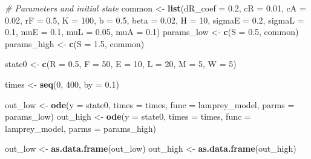\documentclass[
]{article}
\newenvironment{Shaded}{\begin{snugshade}}{\end{snugshade}}
\newcommand{\AttributeTok}[1]{\textcolor[rgb]{0.13,0.29,0.53}{#1}}
\newcommand{\CommentTok}[1]{\textcolor[rgb]{0.56,0.35,0.01}{\textit{#1}}}
\newcommand{\DecValTok}[1]{\textcolor[rgb]{0.00,0.00,0.81}{#1}}
\newcommand{\FloatTok}[1]{\textcolor[rgb]{0.00,0.00,0.81}{#1}}
\newcommand{\FunctionTok}[1]{\textcolor[rgb]{0.13,0.29,0.53}{\textbf{#1}}}
\newcommand{\NormalTok}[1]{#1}
\newcommand{\OtherTok}[1]{\textcolor[rgb]{0.56,0.35,0.01}{#1}}
\begin{document}
\begin{Shaded}
\begin{Highlighting}[]
\CommentTok{\# Parameters and initial state}
\NormalTok{common }\OtherTok{\textless{}{-}} \FunctionTok{list}\NormalTok{(}\AttributeTok{dR\_coef =} \FloatTok{0.2}\NormalTok{, }\AttributeTok{cR =} \FloatTok{0.01}\NormalTok{, }\AttributeTok{cA =} \FloatTok{0.02}\NormalTok{, }\AttributeTok{rF =} \FloatTok{0.5}\NormalTok{, }\AttributeTok{K =} \DecValTok{100}\NormalTok{,}
               \AttributeTok{b =} \FloatTok{0.5}\NormalTok{, }\AttributeTok{beta =} \FloatTok{0.02}\NormalTok{, }\AttributeTok{H =} \DecValTok{10}\NormalTok{, }\AttributeTok{sigmaE =} \FloatTok{0.2}\NormalTok{, }\AttributeTok{sigmaL =} \FloatTok{0.1}\NormalTok{,}
               \AttributeTok{muE =} \FloatTok{0.1}\NormalTok{, }\AttributeTok{muL =} \FloatTok{0.05}\NormalTok{, }\AttributeTok{muA =} \FloatTok{0.1}\NormalTok{)}
\NormalTok{params\_low }\OtherTok{\textless{}{-}} \FunctionTok{c}\NormalTok{(}\AttributeTok{S =} \FloatTok{0.5}\NormalTok{, common)}
\NormalTok{params\_high }\OtherTok{\textless{}{-}} \FunctionTok{c}\NormalTok{(}\AttributeTok{S =} \FloatTok{1.5}\NormalTok{, common)}

\NormalTok{state0 }\OtherTok{\textless{}{-}} \FunctionTok{c}\NormalTok{(}\AttributeTok{R =} \FloatTok{0.5}\NormalTok{, }\AttributeTok{F =} \DecValTok{50}\NormalTok{, }\AttributeTok{E =} \DecValTok{10}\NormalTok{, }\AttributeTok{L =} \DecValTok{20}\NormalTok{, }\AttributeTok{M =} \DecValTok{5}\NormalTok{, }\AttributeTok{W =} \DecValTok{5}\NormalTok{)}

\NormalTok{times }\OtherTok{\textless{}{-}} \FunctionTok{seq}\NormalTok{(}\DecValTok{0}\NormalTok{, }\DecValTok{400}\NormalTok{, }\AttributeTok{by =} \FloatTok{0.1}\NormalTok{)}

\NormalTok{out\_low }\OtherTok{\textless{}{-}} \FunctionTok{ode}\NormalTok{(}\AttributeTok{y =}\NormalTok{ state0, }\AttributeTok{times =}\NormalTok{ times, }\AttributeTok{func =}\NormalTok{ lamprey\_model, }\AttributeTok{parms =}\NormalTok{ params\_low)}
\NormalTok{out\_high }\OtherTok{\textless{}{-}} \FunctionTok{ode}\NormalTok{(}\AttributeTok{y =}\NormalTok{ state0, }\AttributeTok{times =}\NormalTok{ times, }\AttributeTok{func =}\NormalTok{ lamprey\_model, }\AttributeTok{parms =}\NormalTok{ params\_high)}

\NormalTok{out\_low }\OtherTok{\textless{}{-}} \FunctionTok{as.data.frame}\NormalTok{(out\_low)}
\NormalTok{out\_high }\OtherTok{\textless{}{-}} \FunctionTok{as.data.frame}\NormalTok{(out\_high)}


\end{Highlighting}
\end{Shaded}
\end{document}
